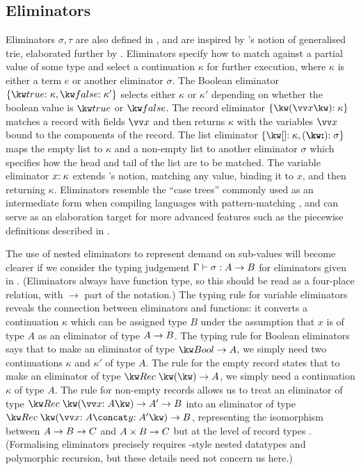 \subsection{Eliminators}
\label{sec:core-language:syntax-eliminator}
Eliminators $\sigma, \tau$ are also defined in , and are inspired by \citeauthor{connelly95}'s notion of generalised trie, elaborated further by \citet{hinze00}. Eliminators specify how to match against a partial value of some type and select a continuation $\kappa$ for further execution, where $\kappa$ is either a term $e$ or another eliminator $\sigma$. The Boolean eliminator $\elimBool{\kappa}{\kappa'}$ selects either $\kappa$ or $\kappa'$ depending on whether the boolean value is $\exTrue$ or $\exFalse$. The record eliminator $\elimRec{\seq{x}}{\kappa}$ matches a record with fields $\seq{x}$ and then returns $\kappa$ with the variables $\seq{x}$ bound to the components of the record. The list eliminator $\elimList{\kappa}{\sigma}$ maps the empty list to $\kappa$ and a non-empty list to another eliminator $\sigma$ which specifies how the head and tail of the list are to be matched. The variable eliminator ${x}{:}\;{\kappa}$ extends \citeauthor{connelly95}'s notion, matching any value, binding it to $x$, and then returning $\kappa$. Eliminators resemble the ``case trees'' commonly used as an intermediate form when compiling languages with pattern-matching \cite{graf20}, and can serve as an elaboration target for more advanced features such as the piecewise definitions described in .



The use of nested eliminators to represent demand on sub-values will become clearer if we consider the typing judgement $\Gamma \vdash \sigma: {A}\rightarrow{B}$ for eliminators given in . (Eliminators always have function type, so this should be read as a four-place relation, with $\to$ part of the notation.) The typing rule for variable eliminators reveals the connection between eliminators and functions: it converts a continuation $\kappa$ which can be assigned type $B$ under the assumption that $x$ is of type $A$ as an eliminator of type ${A}\rightarrow{B}$. The typing rule for Boolean eliminators says that to make an eliminator of type $\tyFun{\tyBool}{A}$, we simply need two continuations $\kappa$ and $\kappa'$ of type $A$. The rule for the empty record states that to make an eliminator of type $\tyFun{\tyRec{}}{A}$, we simply need a continuation $\kappa$ of type $A$. The rule for non-empty records allows us to treat an eliminator of type $\tyFun{\tyRec{\vec{\bind{x}{A}}}}{\tyFun{A'}{B}}$ into an eliminator of type $\tyFun{\tyRec{\vec{\bind{x}{A}} \concat \bind{y}{A'}}}{B}$, representing the isomorphism between ${{A}\rightarrow{B}}\rightarrow{C}$ and ${{A}\times{B}}\rightarrow{C}$ but at the level of record types \cite{hinze00}. (Formalising eliminators precisely requires \citeauthor{bird98}-style nested datatypes \cite{bird98} and polymorphic recursion, but these details need not concern us here.)

